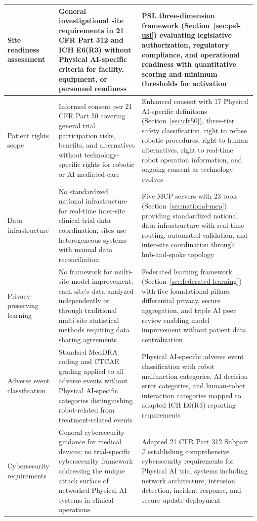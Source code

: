 \begin{longtable}{p{2.5cm} p{4.5cm} p{5.5cm}}
\midrule
Site readiness assessment & General investigational site requirements in 21 CFR Part 312 and ICH E6(R3) without Physical AI-specific criteria for facility, equipment, or personnel readiness & PSL three-dimension framework (Section~\ref{sec:psl-usl}) evaluating legislative authorization, regulatory compliance, and operational readiness with quantitative scoring and minimum thresholds for activation \\
\midrule
Patient rights scope & Informed consent per 21 CFR Part 50 covering general trial participation risks, benefits, and alternatives without technology-specific rights for robotic or AI-mediated care & Enhanced consent with 17 Physical AI-specific definitions (Section~\ref{sec:cfr50}), three-tier safety classification, right to refuse robotic procedures, right to human alternatives, right to real-time robot operation information, and ongoing consent as technology evolves \\
\midrule
Data infrastructure & No standardized national infrastructure for real-time inter-site clinical trial data coordination; sites use heterogeneous systems with manual data reconciliation & Five MCP servers with 23 tools (Section~\ref{sec:national-mcp}) providing standardized national data infrastructure with real-time routing, automated validation, and inter-site coordination through hub-and-spoke topology \\
\midrule
Privacy-preserving learning & No framework for multi-site model improvement; each site's data analyzed independently or through traditional multi-site statistical methods requiring data sharing agreements & Federated learning framework (Section~\ref{sec:federated-learning}) with five foundational pillars, differential privacy, secure aggregation, and triple AI peer review enabling model improvement without patient data centralization \\
\midrule
Adverse event classification & Standard MedDRA coding and CTCAE grading applied to all adverse events without Physical AI-specific categories distinguishing robot-related from treatment-related events & Physical AI-specific adverse event classification with robot malfunction categories, AI decision error categories, and human-robot interaction categories mapped to adapted ICH E6(R3) \cite{ich-adapt} reporting requirements \\
\midrule
Cybersecurity requirements & General cybersecurity guidance for medical devices; no trial-specific cybersecurity framework addressing the unique attack surface of networked Physical AI systems in clinical operations & Adapted 21 CFR Part 312 \cite{cfr312-adapt} Subpart J establishing comprehensive cybersecurity requirements for Physical AI trial systems including network architecture, intrusion detection, incident response, and secure update deployment \\

\end{longtable}
